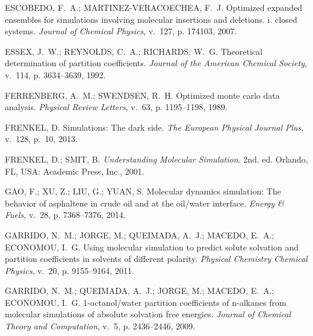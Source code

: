 \documentclass[
	12pt,				%
	openany,			%
	oneside,			%
	a4paper,			%
	english,			%
	brazil				%
	]{abntex2}
\begin{document}
\begin{thebibliography}{}
{ESCOBEDO, F.~A.; MARTINEZ-VERACOECHEA, F.~J. Optimized expanded ensembles for
  simulations involving molecular insertions and deletions. i. closed systems.
\emph{Journal of Chemical Physics}, v.~127, p. 174103, 2007.}

{ESSEX, J.~W.; REYNOLDS, C.~A.; RICHARDS, W.~G. Theoretical determination of
  partition coefficients.
\emph{Journal of the American Chemical Society}, v.~114, p. 3634--3639, 1992.}

{FERRENBERG, A.~M.; SWENDSEN, R.~H. Optimized monte carlo data analysis.
\emph{Physical Review Letters}, v.~63, p. 1195--1198, 1989.}

{FRENKEL, D. Simulations: The dark side.
\emph{The European Physical Journal Plus}, v.~128, p.~10, 2013.}

{FRENKEL, D.; SMIT, B. \emph{Understanding Molecular Simulation}. 2nd. ed.
  Orlando, FL, USA: Academic Press, Inc., 2001.}

{GAO, F.; XU, Z.; LIU, G.; YUAN, S. Molecular dynamics simulation: The behavior
  of asphaltene in crude oil and at the oil/water interface.
\emph{Energy \& Fuels}, v.~28, p. 7368--7376, 2014.}

{GARRIDO, N.~M.; JORGE, M.; QUEIMADA, A.~J.; MACEDO, E.~A.; ECONOMOU, I.~G.
  Using molecular simulation to predict solute solvation and partition
  coefficients in solvents of different polarity.
\emph{Physical Chemistry Chemical Physics}, v.~20, p. 9155--9164, 2011.}

{GARRIDO, N.~M.; QUEIMADA, A.~J.; JORGE, M.; MACEDO, E.~A.; ECONOMOU, I.~G.
  1-octanol/water partition coefficients of n-alkanes from molecular
  simulations of absolute solvation free energies.
\emph{Journal of Chemical Theory and Computation}, v.~5, p. 2436--2446, 2009.}


\end{thebibliography}
\end{document}

